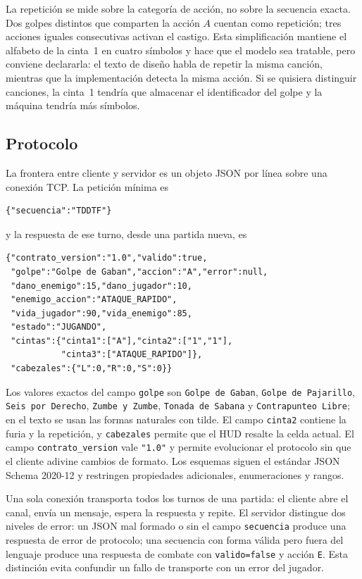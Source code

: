 \documentclass[9pt]{ieeeconf}
\begin{document}
La repetición se mide sobre la categoría de acción, no sobre la secuencia exacta. Dos golpes distintos que comparten la acción $A$ cuentan como repetición; tres acciones iguales consecutivas activan el castigo. Esta simplificación mantiene el alfabeto de la cinta~1 en cuatro símbolos y hace que el modelo sea tratable, pero conviene declararla: el texto de diseño habla de repetir la misma canción, mientras que la implementación detecta la misma acción. Si se quisiera distinguir canciones, la cinta~1 tendría que almacenar el identificador del golpe y la máquina tendría más símbolos.

\subsection{Protocolo}
\label{sec:protocolo}

La frontera entre cliente y servidor es un objeto JSON por línea sobre una conexión TCP. La petición mínima es
\begin{verbatim}
{"secuencia":"TDDTF"}
\end{verbatim}
y la respuesta de ese turno, desde una partida nueva, es
\begin{verbatim}
{"contrato_version":"1.0","valido":true,
 "golpe":"Golpe de Gaban","accion":"A","error":null,
 "dano_enemigo":15,"dano_jugador":10,
 "enemigo_accion":"ATAQUE_RAPIDO",
 "vida_jugador":90,"vida_enemigo":85,
 "estado":"JUGANDO",
 "cintas":{"cinta1":["A"],"cinta2":["1","1"],
           "cinta3":["ATAQUE_RAPIDO"]},
 "cabezales":{"L":0,"R":0,"S":0}}
\end{verbatim}
Los valores exactos del campo \texttt{golpe} son \texttt{Golpe de Gaban}, \texttt{Golpe de Pajarillo}, \texttt{Seis por Derecho}, \texttt{Zumbe y Zumbe}, \texttt{Tonada de Sabana} y \texttt{Contrapunteo Libre}; en el texto se usan las formas naturales con tilde. El campo \texttt{cinta2} contiene la furia y la repetición, y \texttt{cabezales} permite que el HUD resalte la celda actual. El campo \texttt{contrato\_version} vale \texttt{"1.0"} y permite evolucionar el protocolo sin que el cliente adivine cambios de formato. Los esquemas siguen el estándar JSON Schema 2020-12 \cite{jsonschema2020} y restringen propiedades adicionales, enumeraciones y rangos.

Una sola conexión transporta todos los turnos de una partida: el cliente abre el canal, envía un mensaje, espera la respuesta y repite. El servidor distingue dos niveles de error: un JSON mal formado o sin el campo \texttt{secuencia} produce una respuesta de error de protocolo; una secuencia con forma válida pero fuera del lenguaje produce una respuesta de combate con \texttt{valido=false} y acción \texttt{E}. Esta distinción evita confundir un fallo de transporte con un error del jugador.
\end{document}
